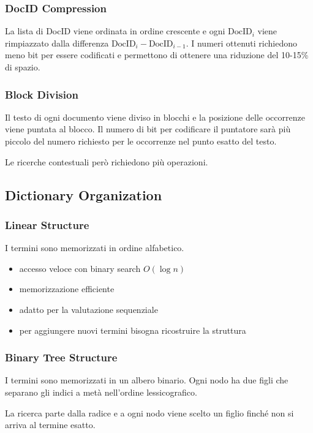 \subsubsection*{DocID Compression}
La lista di DocID viene ordinata in ordine crescente e ogni $\text{DocID}_i$ viene rimpiazzato dalla differenza
$\text{DocID}_i - \text{DocID}_{i-1}$. I numeri ottenuti richiedono meno bit per essere codificati e permettono di ottenere una
riduzione del 10-15\% di spazio.

\subsubsection*{Block Division}
Il testo di ogni documento viene diviso in blocchi e la posizione delle occorrenze viene puntata al blocco.
Il numero di bit per codificare il puntatore sarà più piccolo del numero richiesto per le occorrenze nel punto esatto del testo.

Le ricerche contestuali però richiedono più operazioni.

\subsection{Dictionary Organization}

\subsubsection*{Linear Structure}
I termini sono memorizzati in ordine alfabetico.

\begin{itemize}
  \item accesso veloce con binary search $O(\log n)$
  \item memorizzazione efficiente
  \item adatto per la valutazione sequenziale
  \item per aggiungere nuovi termini bisogna ricostruire la struttura
\end{itemize}

\subsubsection*{Binary Tree Structure}
I termini sono memorizzati in un albero binario.
Ogni nodo ha due figli che separano gli indici a metà nell'ordine lessicografico.

La ricerca parte dalla radice e a ogni nodo viene scelto un figlio finché non si arriva al termine esatto.

